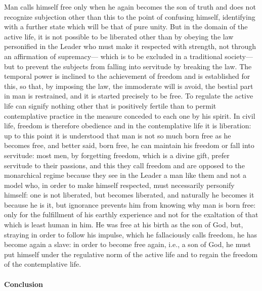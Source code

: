 Man calls himself free only when he again becomes the son of truth and does not recognize subjection other than this to the point of confusing himself, identifying with a further state which will be that of pure unity. But in the domain of the active life, it is not possible to be liberated other than by obeying the law personified in the Leader who must make it respected with strength, not through an affirmation of supremacy— which is to be excluded in a traditional society—but to prevent the subjects from falling into servitude by breaking the law. The temporal power is inclined to the achievement of freedom and is established for this, so that, by imposing the law, the immoderate will is avoid, the bestial part in man is restrained, and it is started precisely to be free. To regulate the active life can signify nothing other that is positively fertile than to permit contemplative practice in the measure conceded to each one by his spirit. In civil life, freedom is therefore obedience and in the contemplative life it is liberation: up to this point it is understood that man is not so much born free as he becomes free, and better said, born free, he can maintain his freedom or fall into servitude: most men, by forgetting freedom, which is a divine gift, prefer servitude to their passions, and this they call freedom and are opposed to the monarchical regime because they see in the Leader a man like them and not a model who, in order to make himself respected, must necessarily personify himself: one is not liberated, but becomes liberated, and naturally he becomes it because he is it, but ignorance prevents him from knowing why man is born free: only for the fulfillment of his earthly experience and not for the exaltation of that which is least human in him. He was free at his birth as the son of God, but, straying in order to follow his impulse, which he fallaciously calls freedom, he has become again a slave: in order to become free again, i.e., a son of God, he must put himself under the regulative norm of the active life and to regain the freedom of the contemplative life.

\paragraph{Conclusion}

